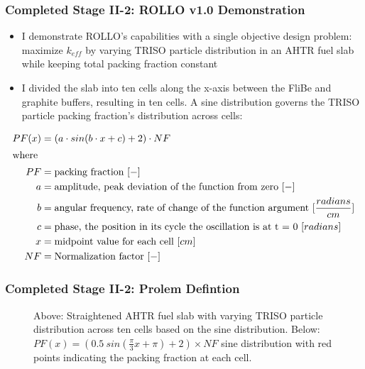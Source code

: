 \begin{frame}
    \frametitle{Completed Stage II-2: ROLLO v1.0 Demonstration}
    \begin{itemize}
        \item I demonstrate ROLLO's capabilities with a single objective design 
        problem: maximize $k_{eff}$ by varying TRISO particle distribution in an 
        AHTR fuel slab while keeping total packing fraction constant
        \item I divided the slab into ten cells along the x-axis between the FliBe and 
        graphite buffers, resulting in ten cells. A sine distribution governs the 
        TRISO particle packing fraction's distribution across cells:
    \end{itemize}
    \small
    \begin{align*}
        PF(x) &= \left(a\cdot sin(b\cdot x + c) + 2\right) \cdot NF\\
        \intertext{where}
        PF &= \mbox{packing fraction } [-] \nonumber \\ 
        a &= \mbox{amplitude, peak deviation of the function from zero } [-] \nonumber \\
        b &= \mbox{angular frequency, rate of change of the function argument } [\frac{radians}{cm}] \nonumber \\
        c &= \mbox{phase, the position in its cycle the oscillation is at t = 0 } [radians]\nonumber \\
        x &= \mbox{midpoint value for each cell } [cm]\nonumber \\
        NF &= \mbox{Normalization factor } [-]\nonumber
    \end{align*}
\end{frame}

\begin{frame}
    \frametitle{Completed Stage II-2: Prolem Defintion}
    \begin{figure}[]
        \centering
        \caption{Above: Straightened AHTR fuel slab with varying TRISO particle 
        distribution across ten cells based on the sine distribution. 
        Below: $PF(x) = (0.5\ sin(\frac{\pi}{3}x + \pi) + 2)  \times NF$ 
        sine distribution with red points indicating the packing fraction at each cell. }
    \end{figure}
\end{frame}

